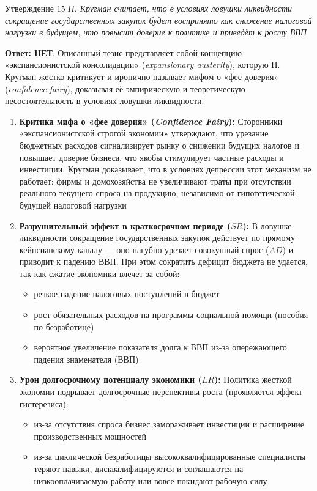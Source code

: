 \documentclass[10pt,a4paper]{article}
\newcommand{\qnet}{\textbf{\color{nored}Ответ: НЕТ}}
\newenvironment{answer}[2]{%
  \begin{qbox}{Утверждение #1}
  \textit{#2}\par\smallskip
}{%
  \end{qbox}\vspace{2pt}
}
\begin{document}
\begin{answer}{15}{П. Кругман считает, что в условиях ловушки ликвидности сокращение государственных закупок будет воспринято как снижение налоговой нагрузки в будущем, что повысит доверие к политике и приведёт к росту ВВП.}
\qnet. Описанный тезис представляет собой концепцию «экспансионистской консолидации» (\textit{expansionary austerity}), которую П. Кругман жестко критикует и иронично называет мифом о «фее доверия» (\textit{confidence fairy}), доказывая её эмпирическую и теоретическую несостоятельность в условиях ловушки ликвидности.

\begin{enumerate}
    \item \textbf{Критика мифа о «фее доверия» (\textit{Confidence Fairy}):}
    Сторонники «экспансионистской строгой экономии» утверждают, что урезание бюджетных расходов сигнализирует рынку о снижении будущих налогов и повышает доверие бизнеса, что якобы стимулирует частные расходы и инвестиции. Кругман доказывает, что в условиях депрессии этот механизм не работает: фирмы и домохозяйства не увеличивают траты при отсутствии реального текущего спроса на продукцию, независимо от гипотетической будущей налоговой нагрузки

    \item \textbf{Разрушительный эффект в краткосрочном периоде ($SR$):}
    В ловушке ликвидности сокращение государственных закупок действует по прямому кейнсианскому каналу — оно пагубно урезает совокупный спрос ($AD$) и приводит к падению ВВП. При этом сократить дефицит бюджета не удается, так как сжатие экономики влечет за собой:
    \begin{itemize}
        \item резкое падение налоговых поступлений в бюджет
        \item рост обязательных расходов на программы социальной помощи (пособия по безработице)
        \item вероятное увеличение показателя долга к ВВП из-за опережающего падения знаменателя (ВВП)
    \end{itemize}

    \item \textbf{Урон долгосрочному потенциалу экономики ($LR$):}
    Политика жесткой экономии подрывает долгосрочные перспективы роста (проявляется эффект гистерезиса):
    \begin{itemize}
        \item из-за отсутствия спроса бизнес замораживает инвестиции и расширение производственных мощностей
        \item из-за циклической безработицы высококвалифицированные специалисты теряют навыки, дисквалифицируются и соглашаются на низкооплачиваемую работу или вовсе покидают рабочую силу
    \end{itemize}
\end{enumerate}
\end{answer}
\end{document}
